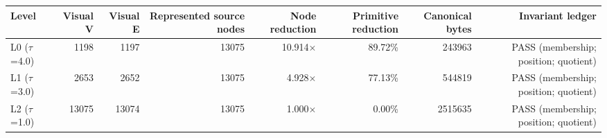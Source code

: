 \begin{tabular}{lrrrrrrr}
\hline
Level & Visual V & Visual E & Represented source nodes & Node reduction & Primitive reduction & Canonical bytes & Invariant ledger \\
\hline
L0 (\ensuremath{\tau}=4.0) & 1198 & 1197 & 13075 & 10.914\ensuremath{\times} & 89.72\% & 243963 & PASS (membership; position; quotient) \\
L1 (\ensuremath{\tau}=3.0) & 2653 & 2652 & 13075 & 4.928\ensuremath{\times} & 77.13\% & 544819 & PASS (membership; position; quotient) \\
L2 (\ensuremath{\tau}=1.0) & 13075 & 13074 & 13075 & 1.000\ensuremath{\times} & 0.00\% & 2515635 & PASS (membership; position; quotient) \\
\hline
\end{tabular}
